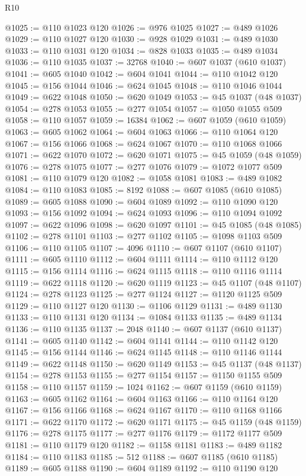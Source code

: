 \begin{lexlean}{R10}
\begin{coremodule}
{{{{{{{{{{{{{{{{{{{{{{{{{{{{{{{{{{{{{{{{{{{{{{{{{{{{{{{{{{{{{{{{{{{{{{{{{{{{{{{{{{{{@1025 := @110 @1023 @120
@1026 := @976 @1025
@1027 := @489 @1026
@1029 := @110 @1027 @120
@1030 := @928 @1029
@1031 := @489 @1030
@1033 := @110 @1031 @120
@1034 := @828 @1033
@1035 := @489 @1034
@1036 := @110 @1035
@1037 := 32768
@1040 := @607 @1037 (@610 @1037)
@1041 := @605 @1040
@1042 := @604 @1041
@1044 := @110 @1042 @120
@1045 := @156 @1044
@1046 := @624 @1045
@1048 := @110 @1046 @1044
@1049 := @622 @1048
@1050 := @620 @1049
@1053 := @45 @1037 (@48 @1037)
@1054 := @278 @1053
@1055 := @277 @1054
@1057 := @1050 @1055 @509
@1058 := @110 @1057
@1059 := 16384
@1062 := @607 @1059 (@610 @1059)
@1063 := @605 @1062
@1064 := @604 @1063
@1066 := @110 @1064 @120
@1067 := @156 @1066
@1068 := @624 @1067
@1070 := @110 @1068 @1066
@1071 := @622 @1070
@1072 := @620 @1071
@1075 := @45 @1059 (@48 @1059)
@1076 := @278 @1075
@1077 := @277 @1076
@1079 := @1072 @1077 @509
@1081 := @110 @1079 @120
@1082 := @1058 @1081
@1083 := @489 @1082
@1084 := @110 @1083
@1085 := 8192
@1088 := @607 @1085 (@610 @1085)
@1089 := @605 @1088
@1090 := @604 @1089
@1092 := @110 @1090 @120
@1093 := @156 @1092
@1094 := @624 @1093
@1096 := @110 @1094 @1092
@1097 := @622 @1096
@1098 := @620 @1097
@1101 := @45 @1085 (@48 @1085)
@1102 := @278 @1101
@1103 := @277 @1102
@1105 := @1098 @1103 @509
@1106 := @110 @1105
@1107 := 4096
@1110 := @607 @1107 (@610 @1107)
@1111 := @605 @1110
@1112 := @604 @1111
@1114 := @110 @1112 @120
@1115 := @156 @1114
@1116 := @624 @1115
@1118 := @110 @1116 @1114
@1119 := @622 @1118
@1120 := @620 @1119
@1123 := @45 @1107 (@48 @1107)
@1124 := @278 @1123
@1125 := @277 @1124
@1127 := @1120 @1125 @509
@1129 := @110 @1127 @120
@1130 := @1106 @1129
@1131 := @489 @1130
@1133 := @110 @1131 @120
@1134 := @1084 @1133
@1135 := @489 @1134
@1136 := @110 @1135
@1137 := 2048
@1140 := @607 @1137 (@610 @1137)
@1141 := @605 @1140
@1142 := @604 @1141
@1144 := @110 @1142 @120
@1145 := @156 @1144
@1146 := @624 @1145
@1148 := @110 @1146 @1144
@1149 := @622 @1148
@1150 := @620 @1149
@1153 := @45 @1137 (@48 @1137)
@1154 := @278 @1153
@1155 := @277 @1154
@1157 := @1150 @1155 @509
@1158 := @110 @1157
@1159 := 1024
@1162 := @607 @1159 (@610 @1159)
@1163 := @605 @1162
@1164 := @604 @1163
@1166 := @110 @1164 @120
@1167 := @156 @1166
@1168 := @624 @1167
@1170 := @110 @1168 @1166
@1171 := @622 @1170
@1172 := @620 @1171
@1175 := @45 @1159 (@48 @1159)
@1176 := @278 @1175
@1177 := @277 @1176
@1179 := @1172 @1177 @509
@1181 := @110 @1179 @120
@1182 := @1158 @1181
@1183 := @489 @1182
@1184 := @110 @1183
@1185 := 512
@1188 := @607 @1185 (@610 @1185)
@1189 := @605 @1188
@1190 := @604 @1189
@1192 := @110 @1190 @120
}}}}}}}}}}}}}}}}}}}}}}}}}}}}}}}}}}}}}}}}}}}}}}}}}}}}}}}}}}}}}}}}}}}}}}}}}}}}}}}}}}}}
\end{coremodule}
\end{lexlean}
